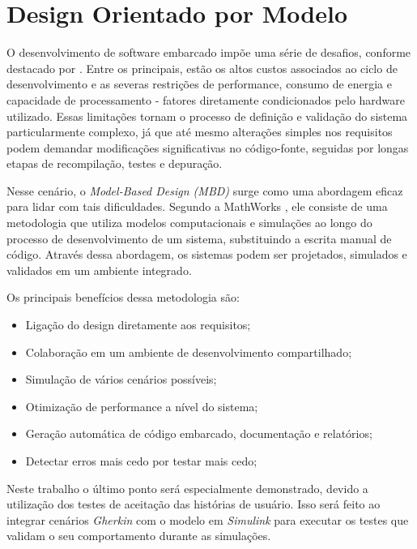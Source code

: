 
\section{\textbf{Design Orientado por Modelo}}
O desenvolvimento de software embarcado impõe uma série de desafios, conforme destacado por . Entre os principais, estão os altos custos associados 
ao ciclo de desenvolvimento e as severas restrições de performance, consumo de energia e capacidade de processamento - fatores diretamente condicionados pelo 
hardware utilizado. Essas limitações tornam o processo de definição e validação do sistema particularmente complexo, já que até mesmo alterações simples nos 
requisitos podem demandar modificações significativas no código-fonte, seguidas por longas etapas de recompilação, testes e depuração.

Nesse cenário, o \textit{Model-Based Design (MBD)} surge como uma abordagem eficaz para lidar com tais dificuldades. Segundo a MathWorks \cite{mathworksMBD2024}, ele 
consiste de uma metodologia que utiliza modelos computacionais e simulações ao longo do processo de desenvolvimento de um sistema, substituindo a escrita manual 
de código. Através dessa abordagem, os sistemas podem ser projetados, simulados e validados em um ambiente integrado.

Os principais benefícios dessa metodologia são:

\begin{itemize}
	\item Ligação do design diretamente aos requisitos;
	\item Colaboração em um ambiente de desenvolvimento compartilhado;
	\item Simulação de vários cenários possíveis;
	\item Otimização de performance a nível do sistema;
	\item Geração automática de código embarcado, documentação e relatórios;
	\item Detectar erros mais cedo por testar mais cedo;
\end{itemize}

Neste trabalho o último ponto será especialmente demonstrado, devido a utilização dos testes de aceitação das histórias de usuário. Isso será feito ao integrar 
cenários \textit{Gherkin} com o modelo em \textit{Simulink} para executar os testes que validam o seu comportamento durante as simulações.

